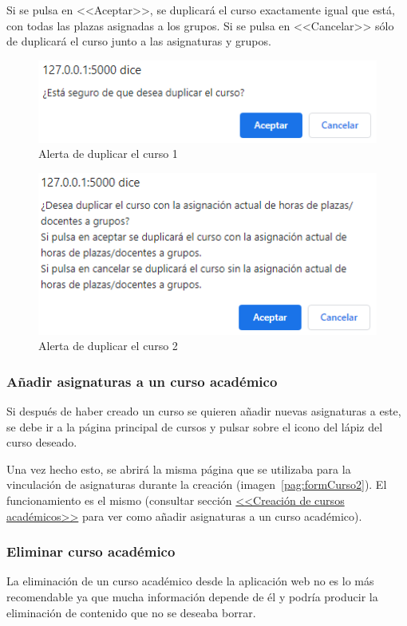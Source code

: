 Si se pulsa en <<Aceptar>>, se duplicará el curso exactamente igual que está, con todas las plazas asignadas a los grupos. 
Si se pulsa en <<Cancelar>> sólo de duplicará el curso junto a las asignaturas y grupos.

\begin{figure}
	\centering
	\includegraphics[width=.7\textwidth]{../img/Anexos/Manual usuario/alertCurso1.png}
	\caption{Alerta de duplicar el curso 1}\label{pag:alertCurso1}
\end{figure}

\begin{figure}
	\centering
	\includegraphics[width=.7\textwidth]{../img/Anexos/Manual usuario/alertCurso2.png}
	\caption{Alerta de duplicar el curso 2}\label{pag:alertCurso2}
\end{figure}

\subsubsection{Añadir asignaturas a un curso académico}
Si después de haber creado un curso se quieren añadir nuevas asignaturas a este, se debe ir a la página principal de cursos y pulsar sobre el icono del lápiz del curso deseado.

Una vez hecho esto, se abrirá la misma página que se utilizaba para la vinculación de asignaturas durante la creación (imagen~\ref{pag:formCurso2}).
El funcionamiento es el mismo (consultar sección \hyperref[section:crearCurso]{<<Creación de cursos académicos>>} para ver como añadir asignaturas a un curso académico).

\subsubsection{Eliminar curso académico}
La eliminación de un curso académico desde la aplicación web no es lo más recomendable ya que mucha información depende de él y podría producir la eliminación de contenido que no se deseaba borrar.

